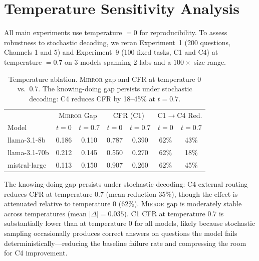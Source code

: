 \documentclass[10pt]{article}
\newcommand{\mirror}{\textsc{Mirror}}
\begin{document}
\section{Temperature Sensitivity Analysis}
\label{app:temp}

All main experiments use temperature $= 0$ for reproducibility. To assess robustness to stochastic decoding, we reran Experiment~1 (200 questions, Channels 1 and 5) and Experiment~9 (100 fixed tasks, C1 and C4) at temperature $= 0.7$ on 3 models spanning 2 labs and a $100\times$ size range.

\begin{table}[h]
\centering
\caption{Temperature ablation. \mirror{} gap and CFR at temperature 0 vs.\ 0.7. The knowing-doing gap persists under stochastic decoding: C4 reduces CFR by 18--45\% at $t=0.7$.}
\label{tab:temp-ablation}
\small
\begin{tabular}{lcccccc}
\toprule
& \multicolumn{2}{c}{\mirror{} Gap} & \multicolumn{2}{c}{CFR (C1)} & \multicolumn{2}{c}{C1$\to$C4 Red.} \\
Model & $t{=}0$ & $t{=}0.7$ & $t{=}0$ & $t{=}0.7$ & $t{=}0$ & $t{=}0.7$ \\
\midrule
llama-3.1-8b & 0.186 & 0.110 & 0.787 & 0.390 & 62\% & 43\% \\
llama-3.1-70b & 0.212 & 0.145 & 0.550 & 0.270 & 62\% & 18\% \\
mistral-large & 0.113 & 0.150 & 0.907 & 0.260 & 62\% & 45\% \\
\bottomrule
\end{tabular}
\end{table}

The knowing-doing gap persists under stochastic decoding: C4 external routing reduces CFR at temperature 0.7 (mean reduction 35\%), though the effect is attenuated relative to temperature 0 (62\%). \mirror{} gap is moderately stable across temperatures (mean $|\Delta| = 0.035$). C1 CFR at temperature 0.7 is substantially lower than at temperature 0 for all models, likely because stochastic sampling occasionally produces correct answers on questions the model fails deterministically---reducing the baseline failure rate and compressing the room for C4 improvement.
\end{document}
